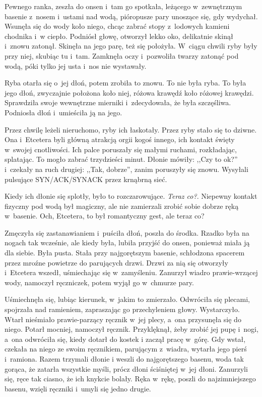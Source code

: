 \documentclass[oneside,polish,11pt,sfheadings]{mwbk}
\begin{document}
Pewnego ranka, zeszła do onsen i~tam go spotkała, leżącego w~zewnętrznym
basenie z~nosem i~ustami nad wodą, pióropusze pary unoszące się, gdy
wydychał. Wsunęła się do wody koło niego, chcąc zabrać stopy z~lodowych
kamieni chodnika i~w ciepło. Podniósł głowę, otworzył lekko oko,
delikatnie skinął i~znowu zatonął. Skinęła na jego parę, też się
położyła. W~ciągu chwili ryby były przy niej, skubiąc tu i~tam. Zamknęła
oczy i~pozwoliła twarzy zatonąć pod wodą, póki tylko jej usta i~nos nie
wystawały.

Ryba otarła się o~jej dłoń, potem zrobiła to znowu. To nie była ryba. To
była jego dłoń, zwyczajnie położona koło niej, różowa krawędź koło
różowej krawędzi. Sprawdziła swoje wewnętrzne mierniki i~zdecydowała, że
była szczęśliwa. Podniosła dłoń i~umieściła ją na jego.

Przez chwilę leżeli nieruchomo, ryby ich łaskotały. Przez ryby stało się
to dziwne. Ona i~Etcetera byli główną atrakcją orgii kogoś innego, ich
kontakt święty w~swojej cnotliwości. Ich palce poruszały się małymi
ruchami, rozkładając, splatając. To mogło zabrać trzydzieści minut.
Dłonie mówiły: ,,Czy to ok?'' i~czekały na ruch drugiej: ,,Tak,
dobrze'', zanim poruszyły się znowu. Wysyłali pulsujące SYN/ACK/SYNACK
przez krnąbrną sieć.

Kiedy ich dłonie się splotły, było to rozczarowujące. \textit{Teraz co?}.
Niepewny kontakt fizyczny pod wodą był magiczny, ale nie zamierzali
zrobić sobie dobrze ręką w~basenie. Och, Etcetera, to był romantyczny
gest, ale teraz co?

Zmęczyła się zastanawianiem i~puściła dłoń, poszła do środka. Rzadko
była na nogach tak wcześnie, ale kiedy była, lubiła przyjść do onsen,
ponieważ miała ją dla siebie. Była pusta. Stała przy najgorętszym
basenie, schłodzona spacerem przez mroźne powietrze do parujących drzwi.
Drzwi za nią się otworzyły i~Etcetera wszedł, uśmiechając się w~zamyśleniu. Zanurzył wiadro prawie-wrzącej wody, namoczył ręczniczek,
potem wyjął go w~chmurze pary.

Uśmiechnęła się, lubiąc kierunek, w~jakim to zmierzało. Odwróciła się
plecami, spojrzała nad ramieniem, zapraszając go przechyleniem głowy.
Wystarczyło. Wtarł nieśmiało prawie-parzący ręcznik w~jej plecy, a~ona
przysunęła się do niego. Potarł mocniej, namoczył ręcznik. Przyklęknął,
żeby zrobić jej pupę i~nogi, a~ona odwróciła się, kiedy dotarł do kostek
i zaczął pracę w~górę. Gdy wstał, czekała na niego ze swoim ręcznikiem,
parującym z~wiadra, wytarła jego pierś i~ramiona. Razem trzymali dłonie
i weszli do najgorętszego basenu, woda tak gorąca, że zatarła wszystkie
myśli, prócz dłoni ściśniętej w~jej dłoni. Zanurzyli się, ręce tak
ciasno, że ich knykcie bolały. Ręka w~rękę, poszli do najzimniejszego
basenu, wzięli ręczniki i~umyli się jedno drugie.
\end{document}
